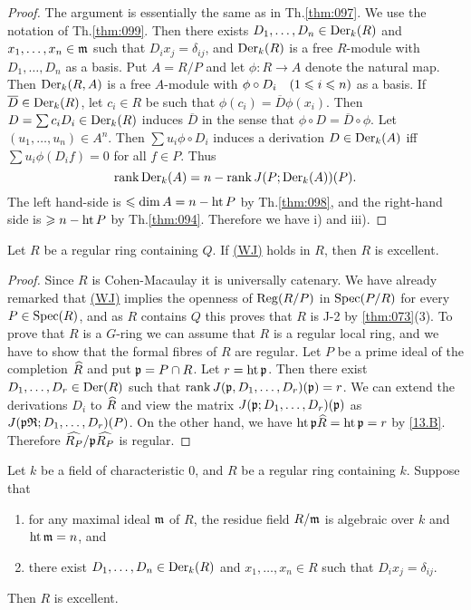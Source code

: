 \documentclass[../main]{subfiles}
\begin{document}
\begin{proof}
The argument is essentially the same as in Th.\ref{thm:097}. We use the notation of Th.\ref{thm:099}. Then there exists $D_1, \dots, D_n \in \operatorname{Der}_k(R)$ and $x_1, \dots, x_n \in \mathfrak{m}$ such that $D_i x_j = \delta_{ij}$, and $\operatorname{Der}_k(R)$ is a free $R$-module with $D_1, \ldots, D_n$ as a basis. Put $A = R/P$ and let $\phi : R \longrightarrow A$ denote the natural map. Then $\operatorname{Der}_k(R, A)$ is a free $A$-module with $\phi \circ D_i\for{1 \le i \le n}$ as a basis. If $\overline D \in \operatorname{Der}_k(R)$, let $c_i \in R$ be such that $\phi(c_i) = \overline D \phi(x_i)$. Then $D = \sum c_i D_i \in \operatorname{Der}_k(R)$ induces $\overline D$ in the sense that $\phi \circ D = \overline D \circ \phi$. Let $(u_1, \ldots, u_n) \in A^n$. Then $\sum u_i \phi \circ D_i$ induces a derivation $D \in \operatorname{Der}_k(A)$ iff $\sum u_i \phi(D_i f) = 0$ for all $f \in P$. Thus
\[
\operatorname{rank} \operatorname{Der}_k(A) = n - \operatorname{rank} J(P; \operatorname{Der}_k(A))(P).
\]
The left hand-side is $\leqslant \operatorname{dim} A = n - \operatorname{ht} P$ by Th.\ref{thm:098}, and the right-hand side is $\geqslant n - \operatorname{ht} P$ by Th.\ref{thm:094}. Therefore we have i) and iii). 
\end{proof}

\begin{theorem}\label{thm:101}
Let $R$ be a regular ring containing $Q$. If \hyperref[40.F]{(WJ)} holds in $R$, then $R$ is excellent.
\end{theorem}

\begin{proof}
Since $R$ is Cohen-Macaulay it is universally catenary. We have already remarked that \hyperref[40.F]{(WJ)} implies the openness of $\operatorname{Reg}(R/P)$ in $\operatorname{Spec}(P/R)$ for every $P \in \operatorname{Spec}(R)$, and as $R$ contains $Q$ this proves that $R$ is J-2 by \ref{thm:073}(3). To prove that $R$ is a $G$-ring we can assume that $R$ is a regular local ring, and we have to show that the formal fibres of $R$ are regular. Let $P$ be a prime ideal of the completion $\widehat{R}$ and put $\mathfrak{p} = P \cap R$. Let $r = \operatorname{ht} \mathfrak{p}$. Then there exist $D_1, \dots, D_r \in \operatorname{Der}(R)$ such that $\operatorname{rank} J(\mathfrak{p}, D_1, \dots, D_r)(\mathfrak{p}) = r$. We can extend the derivations $D_i$ to $\widehat{R}$ and view the matrix $J(\mathfrak{p}; D_1, \dots, D_r)(\mathfrak{p})$ as $J(\mathfrak{p} \mathfrak{R}; D_1, \dots, D_r)(P)$. On the other hand, we have $\operatorname{ht} \mathfrak{p} \widehat{R} = \operatorname{ht} \mathfrak{p} = r$ by \ref{13.B}. Therefore $\widehat{R_P}/{\mathfrak{p}}\widehat{R_P}$ is regular.
\end{proof}

\begin{theorem}\label{thm:102}
Let $k$ be a field of characteristic $0$, and $R$ be a regular ring containing $k$. Suppose that
\begin{enumerate}[label = (\arabic*)]
    \item for any maximal ideal $\mathfrak{m}$ of $R$, the residue field $R/\mathfrak{m}$ is algebraic over $k$ and $\operatorname{ht} \mathfrak{m} = n$, and
    \item there exist $D_1, \dots, D_n \in \operatorname{Der}_k(R)$ and $x_1, \ldots, x_n \in R$ such that $D_i x_j = \delta_{ij}$.
\end{enumerate}
 Then $R$ is excellent. 
\end{theorem}
\end{document}
